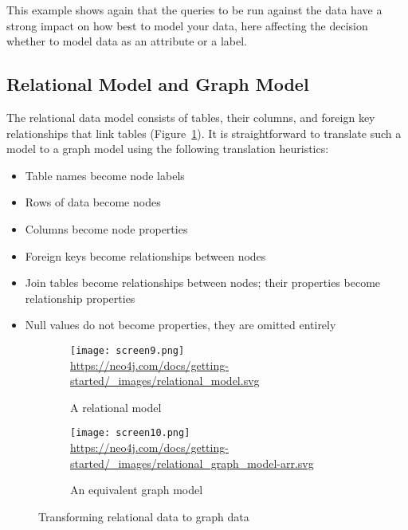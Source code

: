 This example shows again that the queries to be run against the data have a strong impact on how best to model your data, here affecting the decision whether to model data as an attribute or a label.

\subsection*{Relational Model and Graph Model}

The relational data model consists of tables, their columns, and foreign key relationships that link tables (Figure~\ref{fig:relationalgraph1}). It is straightforward to translate such a model to a graph model using the following translation heuristics:

\begin{itemize}
  \item Table names become node labels
  \item Rows of data become nodes
  \item Columns become node properties
  \item Foreign keys become relationships between nodes
  \item Join tables become relationships between nodes; their properties become relationship properties
  \item Null values do not become properties, they are omitted entirely
\end{itemize}

\begin{figure}
\centering
\begin{subfigure}{\textwidth}
    \centering
    \texttt{[image: screen9.png]} \\
    
    \scriptsize{\url{https://neo4j.com/docs/getting-started/_images/relational_model.svg}}
    \caption{A relational model}
    \label{fig:relationalgraph1}
\end{subfigure}
\hfill
\begin{subfigure}{\textwidth}
\centering
\texttt{[image: screen10.png]} \\

\scriptsize{\url{https://neo4j.com/docs/getting-started/_images/relational_graph_model-arr.svg}}
    \caption{An equivalent graph model}
    \label{fig:relationalgraph2}
\end{subfigure}
\hfill
\caption{Transforming relational data to graph data}
\label{fig:relationalgraph}
\end{figure}

